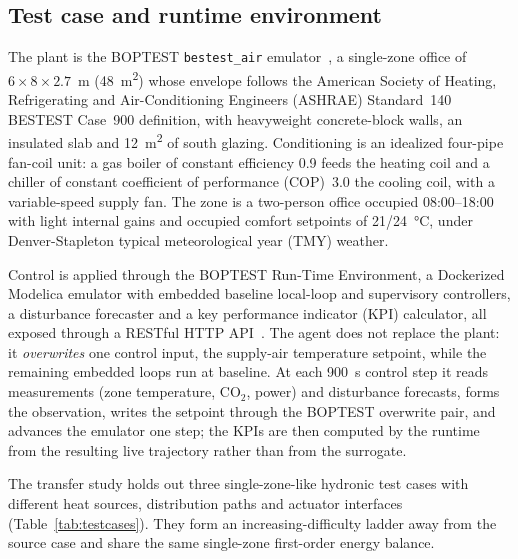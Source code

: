 \documentclass{ieeeaccess}
\begin{document}
\subsection{Test case and runtime environment}\label{ssec:testcase}
The plant is the BOPTEST \texttt{bestest\_air} emulator~\cite{Blum2021BOPTEST,Wetter2014Modelica}, a
single-zone office of $6\times8\times2.7$~m (\SI{48}{\meter\squared}) whose envelope follows the
American Society of Heating, Refrigerating and Air-Conditioning Engineers (ASHRAE) Standard~140 BESTEST Case~900 definition, with heavyweight concrete-block walls, an insulated
slab and \SI{12}{\meter\squared} of south glazing. Conditioning is an idealized four-pipe fan-coil
unit: a gas boiler of constant efficiency 0.9 feeds the heating coil and a chiller of constant
coefficient of performance (COP)~3.0 the cooling coil, with a variable-speed supply fan. The zone is a two-person office occupied
08:00--18:00 with light internal gains and occupied comfort setpoints of 21/\SI{24}{\celsius}, under
Denver-Stapleton typical meteorological year (TMY) weather.

Control is applied through the BOPTEST Run-Time Environment, a Dockerized Modelica emulator with
embedded baseline local-loop and supervisory controllers, a disturbance forecaster and a key performance indicator (KPI)
calculator, all exposed through a RESTful HTTP API~\cite{Arroyo2021GymBOPTEST}. The agent does not
replace the plant: it \emph{overwrites} one control input, the supply-air temperature setpoint,
while the remaining embedded loops run at baseline. At each \SI{900}{\second} control step it reads
measurements (zone temperature, CO$_2$, power) and disturbance forecasts, forms the observation,
writes the setpoint through the BOPTEST overwrite pair, and advances the emulator one step; the KPIs
are then computed by the runtime from the resulting live trajectory rather than from the surrogate.

The transfer study holds out three single-zone-like hydronic test cases with different heat sources,
distribution paths and actuator interfaces (Table~\ref{tab:testcases}). They form an
increasing-difficulty ladder away from the source case and share the same single-zone first-order
energy balance.
\end{document}
